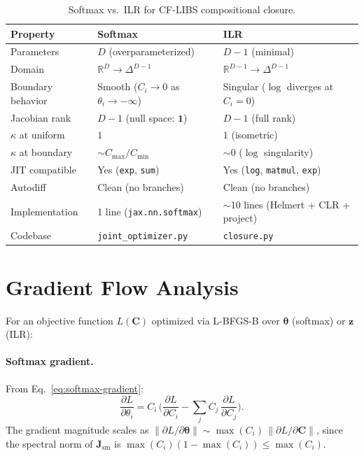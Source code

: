 \documentclass[11pt]{article}
\newcommand{\CC}{\mathbf{C}}
\newcommand{\ttheta}{\boldsymbol{\theta}}
\newcommand{\zz}{\mathbf{z}}
\newcommand{\JJ}{\mathbf{J}}
\newcommand{\ones}{\mathbf{1}}
\begin{document}
\begin{table}[h]
\centering
\caption{Softmax vs.\ ILR for CF-LIBS compositional closure.}
\label{tab:comparison}
\begin{tabular}{@{}lll@{}}
\toprule
\textbf{Property}        & \textbf{Softmax}                    & \textbf{ILR} \\
\midrule
Parameters               & $D$ (overparameterized)              & $D-1$ (minimal) \\
Domain                   & $\mathbb{R}^D \to \Delta^{D-1}$     & $\mathbb{R}^{D-1} \to \Delta^{D-1}$ \\
Boundary behavior        & Smooth ($C_i \to 0$ as $\theta_i \to -\infty$) & Singular ($\log$ diverges at $C_i = 0$) \\
Jacobian rank            & $D-1$ (null space: $\ones$)          & $D-1$ (full rank) \\
$\kappa$ at uniform      & $1$                                  & $1$ (isometric) \\
$\kappa$ at boundary     & $\sim C_\mathrm{max}/C_\mathrm{min}$ & $\sim 0$ ($\log$ singularity) \\
JIT compatible           & Yes (\texttt{exp}, \texttt{sum})     & Yes (\texttt{log}, \texttt{matmul}, \texttt{exp}) \\
Autodiff                 & Clean (no branches)                  & Clean (no branches) \\
Implementation           & 1 line (\texttt{jax.nn.softmax})     & $\sim$10 lines (Helmert + CLR + project) \\
Codebase                 & \texttt{joint\_optimizer.py}         & \texttt{closure.py} \\
\bottomrule
\end{tabular}
\end{table}


\section{Gradient Flow Analysis}
\label{sec:gradient}

For an objective function $L(\CC)$ optimized via L-BFGS-B over
$\ttheta$ (softmax) or $\zz$ (ILR):

\paragraph{Softmax gradient.}
From Eq.~\eqref{eq:softmax-gradient}:
%
\begin{equation}
  \frac{\partial L}{\partial \theta_i}
  = C_i\,\biggl(\frac{\partial L}{\partial C_i}
    - \sum_j C_j\,\frac{\partial L}{\partial C_j}\biggr).
\end{equation}
%
The gradient magnitude scales as
$\|\partial L/\partial\ttheta\| \sim \max(C_i)\,\|\partial L/\partial\CC\|$,
since the spectral norm of $\JJ_\mathrm{sm}$ is $\max(C_i)(1 - \max(C_i))
\le \max(C_i)$.
\end{document}
